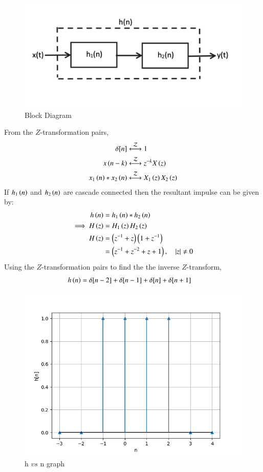 \documentclass[journal,12pt,twocolumn]{IEEEtran}
\theoremstyle{remark}
\begin{document}
\begin{figure}[ht]
    \centering
    \includegraphics[width=\columnwidth]{figs/fig2.png}
    \caption{Block Diagram}
    \label{fig:g2022ee7.2}
\end{figure}  
From the $Z$-transformation pairs,
\begin{align}
    \delta[n] &\overset{\mathcal{Z}}{ \longleftrightarrow} 1  \label{eqn:g22ee7.1}  \\
    x\left(n-k\right) &\overset{\mathcal{Z}}{ \longleftrightarrow} z^{-k}X\left(z\right) \label{eqn:g22ee7.2}   \\
    x_1\left(n\right)\ast x_2\left(n\right) &\overset{\mathcal{Z}}{ \longleftrightarrow} X_1\left(z\right)X_2\left(z\right) \label{eqn:g22ee7.3}
\end{align}
If $h_1\left(n\right)$ and $h_2\left(n\right)$ are cascade connected then the resultant impulse can be given by:
\begin{align}
    h\left(n\right)&=h_1\left(n\right)\ast h_2\left(n\right)    \\
    \implies H\left(z\right)&=H_1\left(z\right)H_2\left(z\right)    \\
    H\left(z\right)&=\left(z^{-1}+z\right)\left(1+z^{-1}\right)   \\
    &=\left(z^{-1}+z^{-2}+z+1\right), \quad \left\vert z\right\vert\neq 0
\end{align}
Using the $Z$-transformation pairs to find the the inverse $Z$-transform,
\begin{align}
    h\left(n\right)&=\delta[n-2]+\delta[n-1]+\delta[n]+\delta[n+1]
\end{align}
\begin{figure}[ht]
    \centering
    \includegraphics[width=\columnwidth]{figs/fig1.png}
    \caption{h $vs$ n graph}
    \label{fig:g2022ee7.1}
\end{figure}     
\end{document}
